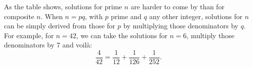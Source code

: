 \documentclass[12pt]{article}
\begin{document}
As the table shows, solutions for prime $n$ are harder to come by than for composite $n$. When $n = pq$, with $p$ prime and $q$ any other integer, solutions for $n$ can be simply derived from those for $p$ by multiplying those denominators by $q$. For example, for $n = 42$, we can take the solutions for $n = 6$, multiply those denominators by 7 and voil\`{a}: $$\frac{4}{42} = \frac{1}{12} + \frac{1}{126} + \frac{1}{252}.$$
\end{document}
